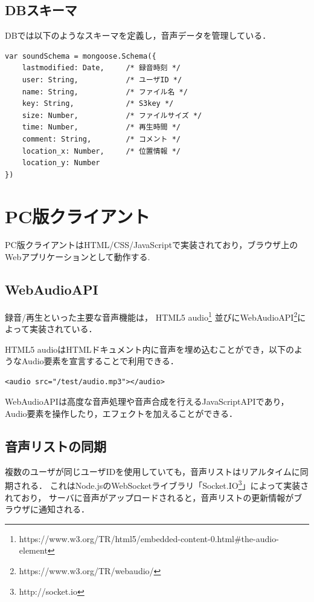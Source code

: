 \subsection{DBスキーマ}

DBでは以下のようなスキーマを定義し，音声データを管理している．

\vspace{4mm}
\begin{lstlisting}
var soundSchema = mongoose.Schema({
    lastmodified: Date,     /* 録音時刻 */
    user: String,           /* ユーザID */
    name: String,           /* ファイル名 */
    key: String,            /* S3key */
    size: Number,           /* ファイルサイズ */
    time: Number,           /* 再生時間 */
    comment: String,        /* コメント */
    location_x: Number,     /* 位置情報 */
    location_y: Number
})
\end{lstlisting}

\section{PC版クライアント}
PC版クライアントはHTML/CSS/JavaScriptで実装されており，ブラウザ上のWebアプリケーションとして動作する.

\subsection{WebAudioAPI}
録音/再生といった主要な音声機能は，
HTML5 audio\footnote{\textsf{https://www.w3.org/TR/html5/embedded-content-0.html\#the-audio-element}}
並びにWebAudioAPI\footnote{\textsf{https://www.w3.org/TR/webaudio/}}によって実装されている．

HTML5 audioはHTMLドキュメント内に音声を埋め込むことができ，以下のようなAudio要素を宣言することで利用できる．

\vspace{4mm}
\begin{lstlisting}
<audio src="/test/audio.mp3"></audio>
\end{lstlisting}

WebAudioAPIは高度な音声処理や音声合成を行えるJavaScriptAPIであり，
Audio要素を操作したり，エフェクトを加えることができる．

\subsection{音声リストの同期}
複数のユーザが同じユーザIDを使用していても，音声リストはリアルタイムに同期される．
これはNode.jsのWebSocketライブラリ「Socket.IO\footnote{\textsf{http://socket.io}}」によって実装されており，
サーバに音声がアップロードされると，音声リストの更新情報がブラウザに通知される．

